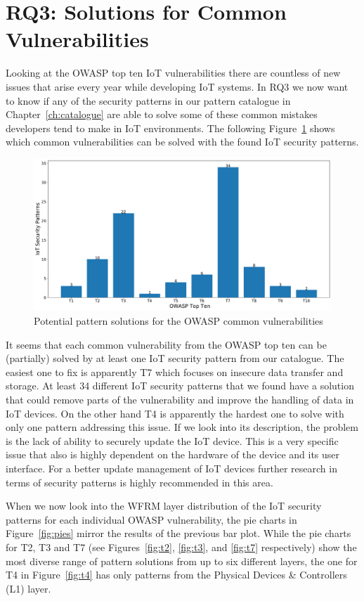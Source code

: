 \section{RQ3: Solutions for Common Vulnerabilities}\label{sec:rq3}
Looking at the OWASP top ten IoT vulnerabilities there are countless of new issues that arise every year while developing IoT systems. In RQ3 we now want to know if any of the security patterns in our pattern catalogue in Chapter~\ref{ch:catalogue} are able to solve some of these common mistakes developers tend to make in IoT environments. The following Figure~\ref{fig:rq3} shows which common vulnerabilities can be solved with the found IoT security patterns. 

\begin{figure}[ht]
	\centering
	\includegraphics[width=0.9\linewidth]{img/RQ3}
	\caption{Potential pattern solutions for the OWASP common vulnerabilities}
	\label{fig:rq3}
\end{figure}

It seems that each common vulnerability from the OWASP top ten can be (partially) solved by at least one IoT security pattern from our catalogue. The easiest one to fix is apparently T7 which focuses on insecure data transfer and storage. At least 34 different IoT security patterns that we found have a solution that could remove parts of the vulnerability and improve the handling of data in IoT devices. On the other hand T4 is apparently the hardest one to solve with only one pattern addressing this issue. If we look into its description, the problem is the lack of ability to securely update the IoT device. This is a very specific issue that also is highly dependent on the hardware of the device and its user interface. For a better update management of IoT devices further research in terms of security patterns is highly recommended in this area.

When we now look into the WFRM layer distribution of the IoT security patterns for each individual OWASP vulnerability, the pie charts in Figure~\ref{fig:pies} mirror the results of the previous bar plot. While the pie charts for T2, T3 and T7 (see Figures~\ref{fig:t2}, \ref{fig:t3}, and \ref{fig:t7} respectively) show the most diverse range of pattern solutions from up to six different layers, the one for T4 in Figure~\ref{fig:t4} has only patterns from the Physical Devices \& Controllers (L1) layer. 

